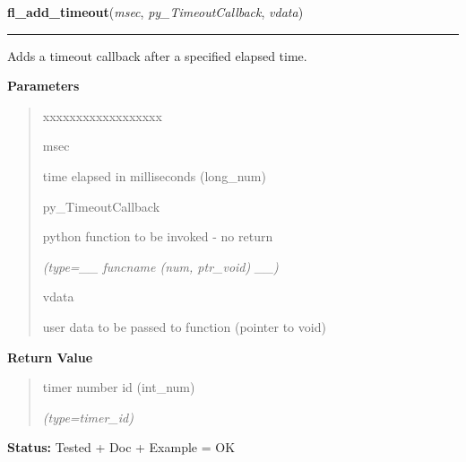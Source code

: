\hspace{.8\funcindent}\begin{boxedminipage}{\funcwidth}

    \raggedright \textbf{fl\_add\_timeout}(\textit{msec}, \textit{py\_TimeoutCallback}, \textit{vdata})

    \vspace{-1.5ex}

    \rule{\textwidth}{0.5\fboxrule}
\setlength{\parskip}{2ex}
    Adds a timeout callback after a specified elapsed time.

\setlength{\parskip}{1ex}
      \textbf{Parameters}
      \vspace{-1ex}

      \begin{quote}
        \begin{Ventry}{xxxxxxxxxxxxxxxxxx}

          \item[msec]

          time elapsed in milliseconds (long\_num)

          \item[py\_TimeoutCallback]

          python function to be invoked - no return

            {\it (type=\_\_ funcname (num, ptr\_void) \_\_)}

          \item[vdata]

          user data to be passed to function (pointer to void)

        \end{Ventry}

      \end{quote}

      \textbf{Return Value}
    \vspace{-1ex}

      \begin{quote}
      timer number id (int\_num)

      {\it (type=timer\_id)}

      \end{quote}

\textbf{Status:} Tested + Doc + Example = OK



    \end{boxedminipage}

    \label{xformslib:library:fl_remove_timeout}

